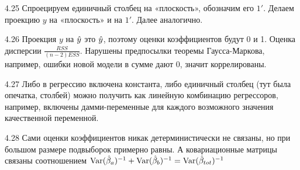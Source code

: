 \protect \hypertarget {soln:4.25}{}
\begin{solution}{{4.25}}
Спроецируем единичный столбец на «плоскость», обозначим его $1'$. Делаем проекцию $y$ на «плоскость» и на $1'$. Далее аналогично.
\end{solution}
\protect \hypertarget {soln:4.26}{}
\begin{solution}{{4.26}}
Проекция $y$ на $\hat{y}$ это $\hat{y}$, поэтому оценки коэффициентов будут 0 и 1. Оценка дисперсии $\frac{RSS}{(n-2)ESS}$. Нарушены предпосылки теоремы Гаусса-Маркова, например, ошибки новой модели в сумме дают 0, значит коррелированы.
\end{solution}
\protect \hypertarget {soln:4.27}{}
\begin{solution}{{4.27}}
Либо в регрессию включена константа, либо единичный столбец (тут была опечатка, столбей) можно получить как линейную комбинацию регрессоров, например, включены дамми-переменные для каждого возможного значения качественной переменной.
\end{solution}
\protect \hypertarget {soln:4.28}{}
\begin{solution}{{4.28}}
Сами оценки коэффициентов никак детерминистически не связаны, но при большом размере подвыборок примерно равны. А ковариационные матрицы связаны соотношением $\operatorname{Var}(\hat{\beta}_a)^{-1}+\operatorname{Var}(\hat{\beta}_b)^{-1}=\operatorname{Var}(\hat{\beta}_{tot})^{-1}$
\end{solution}
\protect \hypertarget {soln:4.29}{}
